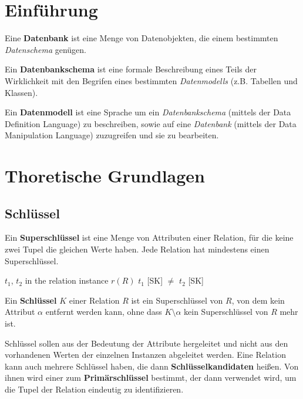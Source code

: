 %
%

%
%
%
\section{Einführung}

Eine \textbf{Datenbank} ist eine Menge von Datenobjekten,
die einem bestimmten \textit{Datenschema} genügen.

Ein \textbf{Datenbankschema} ist eine formale Beschreibung eines Teils der Wirklichkeit
mit den Begrifen eines bestimmten \textit{Datenmodells} (z.B. Tabellen und Klassen).

Ein \textbf{Datenmodell} ist eine Sprache um ein
\textit{Datenbankschema} (mittels der Data Definition Language) zu beschreiben,
sowie auf eine \textit{Datenbank} (mittels der Data Manipulation Language) zuzugreifen und sie zu bearbeiten.

%
%
%
\section{Thoretische Grundlagen}

\subsection{Schlüssel}

Ein \textbf{Superschlüssel} ist eine Menge von Attributen einer Relation,
für die keine zwei Tupel die gleichen Werte haben.
Jede Relation hat mindestens einen Superschlüssel.

$t_1$, $t_2$ in the relation instance $r(R)$
$t_1$ [SK] $\neq$ $t_2$ [SK]

Ein \textbf{Schlüssel} $K$ einer Relation $R$ ist ein Superschlüssel von $R$,
von dem kein Attribut $\alpha$ entfernt werden kann,
ohne dass $K \setminus \alpha$ kein Superschlüssel von $R$ mehr ist.

Schlüssel sollen aus der Bedeutung der Attribute hergeleitet und nicht
aus den vorhandenen Werten der einzelnen Instanzen abgeleitet werden.
Eine Relation kann auch mehrere Schlüssel haben, die dann \textbf{Schlüsselkandidaten} heißen.
Von ihnen wird einer zum \textbf{Primärschlüssel} bestimmt, der dann verwendet wird,
um die Tupel der Relation eindeutig zu identifizieren.

